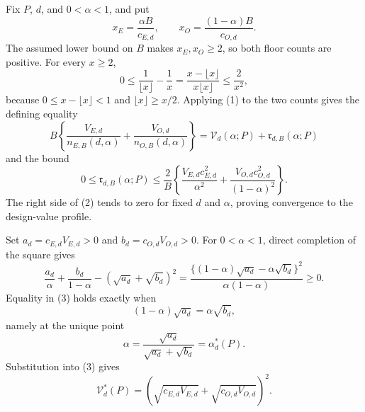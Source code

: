 Fix \(P\), \(d\), and \(0<\alpha<1\), and put
\[
 x_E=\frac{\alpha B}{c_{E,d}},\qquad
 x_O=\frac{(1-\alpha)B}{c_{O,d}}.
\]
The assumed lower bound on \(B\) makes \(x_E,x_O\ge2\), so both floor counts are positive.  For every \(x\ge2\),
\[
 0\le \frac1{\lfloor x\rfloor}-\frac1x
 =\frac{x-\lfloor x\rfloor}{x\lfloor x\rfloor}
 \le \frac{2}{x^2}, \tag{1}
\]
because \(0\le x-\lfloor x\rfloor<1\) and \(\lfloor x\rfloor\ge x/2\).  Applying (1) to the two counts gives the defining equality
\[
 B\left\{\frac{V_{E,d}}{n_{E,B}(d,\alpha)}
 +\frac{V_{O,d}}{n_{O,B}(d,\alpha)}\right\}
 =\mathcal V_d(\alpha;P)+\mathfrak r_{d,B}(\alpha;P)
\]
and the bound
\[
 0\le\mathfrak r_{d,B}(\alpha;P)
 \le\frac2B\left\{
 \frac{V_{E,d}c_{E,d}^2}{\alpha^2}
 +\frac{V_{O,d}c_{O,d}^2}{(1-\alpha)^2}\right\}. \tag{2}
\]
The right side of (2) tends to zero for fixed \(d\) and \(\alpha\), proving convergence to the design-value profile.

Set \(a_d=c_{E,d}V_{E,d}>0\) and \(b_d=c_{O,d}V_{O,d}>0\).  For \(0<\alpha<1\), direct completion of the square gives
\[
 \frac{a_d}{\alpha}+\frac{b_d}{1-\alpha}
 -(\sqrt{a_d}+\sqrt{b_d})^2
 =\frac{\{(1-\alpha)\sqrt{a_d}-\alpha\sqrt{b_d}\}^2}
        {\alpha(1-\alpha)}\ge0. \tag{3}
\]
Equality in (3) holds exactly when
\[
 (1-\alpha)\sqrt{a_d}=\alpha\sqrt{b_d},
\]
namely at the unique point
\[
 \alpha=\frac{\sqrt{a_d}}{\sqrt{a_d}+\sqrt{b_d}}
 =\alpha_d^*(P).
\]
Substitution into (3) gives
\[
 \mathcal V_d^*(P)=(\sqrt{c_{E,d}V_{E,d}}+\sqrt{c_{O,d}V_{O,d}})^2.
\]